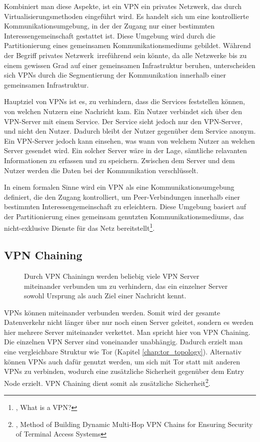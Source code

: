 Kombiniert man diese Aspekte, ist ein VPN ein privates Netzwerk, das durch Virtualisierungsmethoden eingeführt wird. Es handelt sich um eine kontrollierte Kommunikationsumgebung, in der der Zugang nur einer bestimmten Interessengemeinschaft gestattet ist. Diese Umgebung wird durch die Partitionierung eines gemeinsamen Kommunikationsmediums gebildet. Während der Begriff \glqq privates Netzwerk\grqq\ irreführend sein könnte, da alle Netzwerke bis zu einem gewissen Grad auf einer gemeinsamen Infrastruktur beruhen, unterscheiden sich VPNs durch die Segmentierung der Kommunikation innerhalb einer gemeinsamen Infrastruktur.

Hauptziel von VPNs ist es, zu verhindern, dass die Services feststellen können, von welchen Nutzern eine Nachricht kam. Ein Nutzer verbindet sich über den VPN-Server mit einem Service. Der Service sieht jedoch nur den VPN-Server, und nicht den Nutzer. Dadurch bleibt der Nutzer gegenüber dem Service anonym.
Ein VPN-Server jedoch kann einsehen, was wann von welchem Nutzer an welchen Server gesendet wird. Ein solcher Server wäre in der Lage, sämtliche relavanten Informationen zu erfassen und zu speichern. Zwischen dem Server und dem Nutzer werden die Daten bei der Kommunikation verschlüsselt.

In einem formalen Sinne wird ein VPN als eine Kommunikationsumgebung definiert, die den Zugang kontrolliert, um Peer-Verbindungen innerhalb einer bestimmten Interessengemeinschaft zu erleichtern. Diese Umgebung basiert auf der Partitionierung eines gemeinsam genutzten Kommunikationsmediums, das nicht-exklusive Dienste für das Netz bereitstellt\footnote{\cite{DefinitionOfVPN}, What is a VPN?}.

\subsection{VPN Chaining}
\label{chap:vpn_chaining}

\begin{figure}
    \centering
    
    \caption{Durch VPN Chainingn werden beliebig viele VPN Server miteinander verbunden um zu verhindern, das ein einzelner Server sowohl Ursprung als auch Ziel einer Nachricht kennt.}
    \label{imgs:vpn_chaining}
\end{figure}

VPNs können miteinander verbunden werden. Somit wird der gesamte Datenverkehr nicht länger über nur noch einen Server geleitet, sondern es werden hier mehrere Server miteinander verkettet. Man spricht hier von VPN Chaining. Die einzelnen VPN Server sind voneinander unabhängig. Dadurch erzielt man eine vergleichbare Struktur wie Tor  (Kapitel \ref{chap:tor_topology}). Alternativ können VPNs auch dafür genutzt werden, um sich mit Tor statt mit anderen VPNs zu verbinden, wodurch eine zusätzliche Sicherheit gegenüber dem Entry Node erzielt. VPN Chaining dient somit als zusätzliche Sicherheit\footnote{\cite{VPNChains}, Method of Building Dynamic Multi-Hop VPN Chains for Ensuring Security of Terminal Access Systems}.

